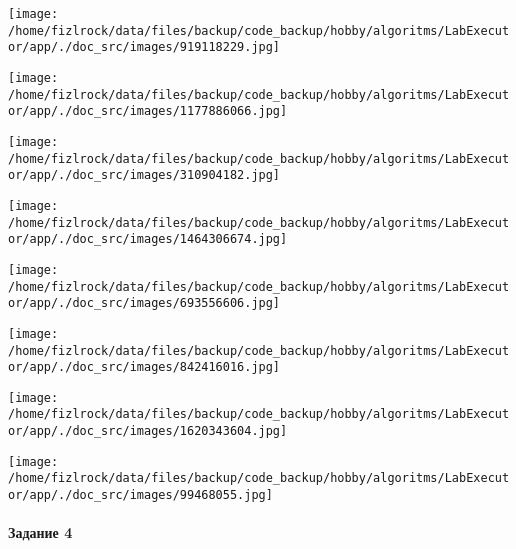 \documentclass[a4paper, 12pt]{article}
\begin{document}
\texttt{[image: /home/fizlrock/data/files/backup/code\_backup/hobby/algoritms/LabExecutor/app/./doc\_src/images/919118229.jpg]}

\texttt{[image: /home/fizlrock/data/files/backup/code\_backup/hobby/algoritms/LabExecutor/app/./doc\_src/images/1177886066.jpg]}

\texttt{[image: /home/fizlrock/data/files/backup/code\_backup/hobby/algoritms/LabExecutor/app/./doc\_src/images/310904182.jpg]}

\texttt{[image: /home/fizlrock/data/files/backup/code\_backup/hobby/algoritms/LabExecutor/app/./doc\_src/images/1464306674.jpg]}

\texttt{[image: /home/fizlrock/data/files/backup/code\_backup/hobby/algoritms/LabExecutor/app/./doc\_src/images/693556606.jpg]}

\texttt{[image: /home/fizlrock/data/files/backup/code\_backup/hobby/algoritms/LabExecutor/app/./doc\_src/images/842416016.jpg]}

\texttt{[image: /home/fizlrock/data/files/backup/code\_backup/hobby/algoritms/LabExecutor/app/./doc\_src/images/1620343604.jpg]}

\texttt{[image: /home/fizlrock/data/files/backup/code\_backup/hobby/algoritms/LabExecutor/app/./doc\_src/images/99468055.jpg]}
\pagebreak
\paragraph{Задание 4}
\end{document}
